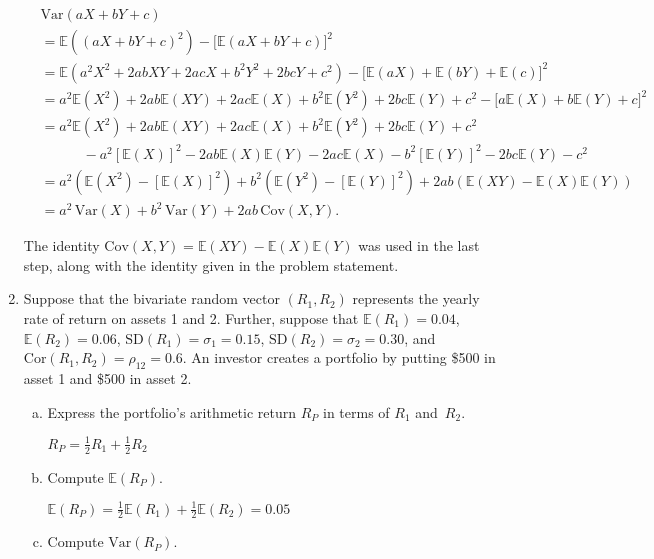 \documentclass[letterpaper,12pt,fleqn]{article}
\begin{document}
\begin{enumerate}
\begin{align*}
&\mbox{Var}(aX + bY + c) \\&= \mathbb{E}((aX+bY+c)^{2}) - \big[ \mathbb{E}(aX+bY+c) \big]^2 \\
&= \mathbb{E}(a^2X^2+2abXY + 2acX+b^2Y^2+2bcY+c^2) - \big[\mathbb{E}(aX)+\mathbb{E}(bY)+\mathbb{E}(c) \big]^2\\
&= a^2\mathbb{E}(X^2) + 2ab\mathbb{E}(XY)+2ac\mathbb{E}(X) +b^2\mathbb{E}(Y^2) + 2bc\mathbb{E}(Y) + c^2- \big[a\mathbb{E}(X)+b\mathbb{E}(Y)+c \big]^2\\
&=a^2\mathbb{E}(X^2) + 2ab\mathbb{E}(XY)+2ac\mathbb{E}(X) +b^2\mathbb{E}(Y^2) + 2bc\mathbb{E}(Y) + c^2 \\
& \quad\quad\quad - a^2[\mathbb{E}(X)]^2 - 2ab\mathbb{E}(X)\mathbb{E}(Y) - 2ac\mathbb{E}(X) -b^2[\mathbb{E}(Y)]^2-2bc\mathbb{E}(Y) - c^2 \\
&= a^2(\mathbb{E}(X^2)-[\mathbb{E}(X)]^2) + b^2(\mathbb{E}(Y^2)-[\mathbb{E}(Y)]^2) + 2ab(\mathbb{E}(XY) -\mathbb{E}(X)\mathbb{E}(Y)) \\
&= a^{2} \, \mbox{Var}(X) + b^{2} \, \mbox{Var}(Y) + 2ab \, \mbox{Cov}(X, Y).
\end{align*}

The identity $\mbox{Cov}(X, Y) =\mathbb{E}(XY) -\mathbb{E}(X)\mathbb{E}(Y)$ was used in the last step, along with the identity given in the problem statement.


\vspace{2em}

\item Suppose that the bivariate random vector $(R_{1}, R_{2})$ represents the yearly rate of return on assets 1 and 2. Further, suppose that $\mathbb{E}(R_{1}) = 0.04$, $\mathbb{E}(R_{2}) = 0.06$, $\mbox{SD}(R_{1}) = \sigma_{1} = 0.15$, $\mbox{SD}(R_{2}) = \sigma_{2} = 0.30$, and $\mbox{Cor}(R_{1}, R_{2}) = \rho_{12} = 0.6$.  An investor creates a portfolio by putting \$500 in asset 1 and \$500 in asset 2.

\begin{enumerate}[a)]
\item Express the portfolio's arithmetic return $R_{P}$ in terms of $R_{1}$ and~$R_{2}$.

$R_P = \frac{1}{2} R_1 + \frac{1}{2} R_2$

\item Compute $\mathbb{E}(R_{P})$.

$\mathbb{E} (R_P) = \frac{1}{2}\mathbb{E} (R_1) + \frac{1}{2} \mathbb{E} (R_2) = 0.05\;$


\item Compute $\mbox{Var}(R_{P})$.


\end{enumerate}
\end{enumerate}
\end{document}
